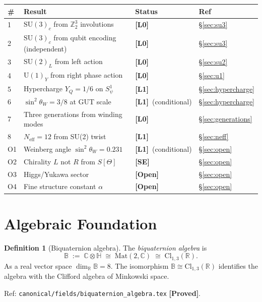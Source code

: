 \documentclass[12pt,a4paper]{article}
\theoremstyle{definition}
\newtheorem{definition}[theorem]{Definition}
\theoremstyle{remark}
\newcommand{\PROVED}{\textbf{[Proved]}}
\newcommand{\OPEN}{\textbf{[Open]}}
\newcommand{\SE}{\textbf{[SE]}}
\newcommand{\SU}[1]{\mathrm{SU}(#1)}
\newcommand{\UU}[1]{\mathrm{U}(#1)}
\newcommand{\Bq}{\mathbb{C}\otimes\mathbb{H}}
\newcommand{\Lone}{\textbf{[L1]}}
\newcommand{\Lzero}{\textbf{[L0]}}
\begin{document}
\begin{center}
\begin{tabular}{llll}
\toprule
\textbf{\#} & \textbf{Result} & \textbf{Status} & \textbf{Ref} \\
\midrule
1 & $\SU{3}_c$ from $\mathbb{Z}_2^3$ involutions & \Lzero & §\ref{sec:su3} \\
2 & $\SU{3}_c$ from qubit encoding (independent) & \Lzero & §\ref{sec:su3} \\
3 & $\SU{2}_L$ from left action & \Lzero & §\ref{sec:su2} \\
4 & $\UU{1}_Y$ from right phase action & \Lzero & §\ref{sec:u1} \\
5 & Hypercharge $Y_Q = 1/6$ on $S^1_\psi$ & \Lone & §\ref{sec:hypercharge} \\
6 & $\sin^2\theta_W = 3/8$ at GUT scale & \Lone\ (conditional) & §\ref{sec:hypercharge} \\
7 & Three generations from winding modes & \Lzero & §\ref{sec:generations} \\
8 & $N_{\mathrm{eff}} = 12$ from SU(2) twist & \Lone & §\ref{sec:neff} \\
\midrule
O1 & Weinberg angle $\sin^2\theta_W = 0.231$ & \Lone\ (conditional) & §\ref{sec:open} \\
O2 & Chirality $L$ not $R$ from $S[\Theta]$ & \SE & §\ref{sec:open} \\
O3 & Higgs/Yukawa sector & \OPEN & §\ref{sec:open} \\
O4 & Fine structure constant $\alpha$ & \OPEN & §\ref{sec:open} \\
\bottomrule
\end{tabular}
\end{center}

\section{Algebraic Foundation}
\label{sec:algebra}

\begin{definition}[Biquaternion algebra]
\label{def:biquaternion}
The \emph{biquaternion algebra} is
\[
  \mathbb{B} \;:=\; \Bq \;\cong\; \mathrm{Mat}(2,\mathbb{C})
\;\cong\; \mathrm{Cl}_{1,3}(\mathbb{R}).
\]
As a real vector space $\dim_\mathbb{R}\mathbb{B} = 8$.
The isomorphism $\mathbb{B}\cong\mathrm{Cl}_{1,3}(\mathbb{R})$ identifies
the algebra with the Clifford algebra of Minkowski space.

Ref: \texttt{canonical/fields/biquaternion\_algebra.tex} \PROVED.
\end{definition}
\end{document}

